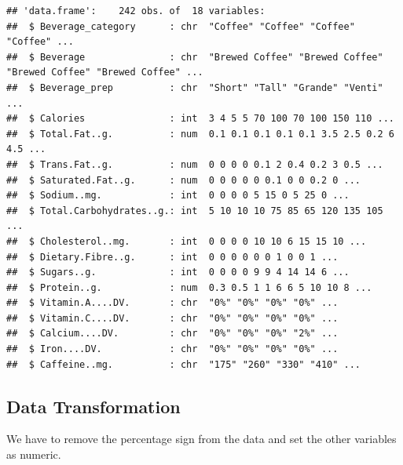 \documentclass[
]{article}
\begin{document}
\begin{verbatim}
## 'data.frame':    242 obs. of  18 variables:
##  $ Beverage_category      : chr  "Coffee" "Coffee" "Coffee" "Coffee" ...
##  $ Beverage               : chr  "Brewed Coffee" "Brewed Coffee" "Brewed Coffee" "Brewed Coffee" ...
##  $ Beverage_prep          : chr  "Short" "Tall" "Grande" "Venti" ...
##  $ Calories               : int  3 4 5 5 70 100 70 100 150 110 ...
##  $ Total.Fat..g.          : num  0.1 0.1 0.1 0.1 0.1 3.5 2.5 0.2 6 4.5 ...
##  $ Trans.Fat..g.          : num  0 0 0 0 0.1 2 0.4 0.2 3 0.5 ...
##  $ Saturated.Fat..g.      : num  0 0 0 0 0 0.1 0 0 0.2 0 ...
##  $ Sodium..mg.            : int  0 0 0 0 5 15 0 5 25 0 ...
##  $ Total.Carbohydrates..g.: int  5 10 10 10 75 85 65 120 135 105 ...
##  $ Cholesterol..mg.       : int  0 0 0 0 10 10 6 15 15 10 ...
##  $ Dietary.Fibre..g.      : int  0 0 0 0 0 0 1 0 0 1 ...
##  $ Sugars..g.             : int  0 0 0 0 9 9 4 14 14 6 ...
##  $ Protein..g.            : num  0.3 0.5 1 1 6 6 5 10 10 8 ...
##  $ Vitamin.A....DV.       : chr  "0%" "0%" "0%" "0%" ...
##  $ Vitamin.C....DV.       : chr  "0%" "0%" "0%" "0%" ...
##  $ Calcium....DV.         : chr  "0%" "0%" "0%" "2%" ...
##  $ Iron....DV.            : chr  "0%" "0%" "0%" "0%" ...
##  $ Caffeine..mg.          : chr  "175" "260" "330" "410" ...
\end{verbatim}

\subsection{Data Transformation}\label{data-transformation}

We have to remove the percentage sign from the data and set the other
variables as numeric.
\end{document}
